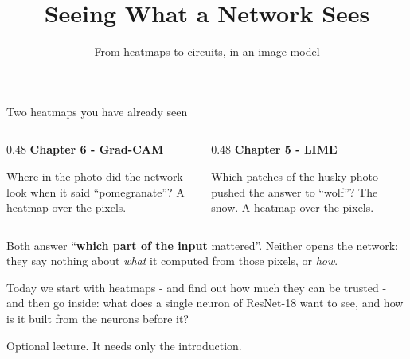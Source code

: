 \documentclass[aspectratio=169]{beamer}
\title{Seeing What a Network Sees}
\subtitle{From heatmaps to circuits, in an image model}
\author{}
\date{}
\newcommand{\keybox}[1]{%
  \begin{tcolorbox}[colback=armblue!8, colframe=armblue, boxrule=0.6pt, arc=2pt]
  #1
  \end{tcolorbox}}
\begin{document}
\begin{frame}[plain]
  \titlepage
\end{frame}

\begin{frame}{Two heatmaps you have already seen}
  \vspace{0.4em}
  \begin{columns}[T]
    \begin{column}{0.48\textwidth}
      \textbf{Chapter 6 - Grad-CAM}

      \vspace{0.3em}
      {\small Where in the photo did the network look when it said ``pomegranate''? A heatmap over
      the pixels.}
    \end{column}
    \begin{column}{0.48\textwidth}
      \textbf{Chapter 5 - LIME}

      \vspace{0.3em}
      {\small Which patches of the husky photo pushed the answer to ``wolf''? The snow. A heatmap
      over the pixels.}
    \end{column}
  \end{columns}

  \vspace{0.9em}
  \keybox{Both answer ``\textbf{which part of the input} mattered''. Neither opens the network: they
  say nothing about \emph{what} it computed from those pixels, or \emph{how}.}

  \vspace{0.6em}
  Today we start with heatmaps - and find out how much they can be trusted - and then go inside:
  what does a single neuron of ResNet-18 want to see, and how is it built from the neurons before
  it?

  \vspace{0.3em}
  {\footnotesize Optional lecture. It needs only the introduction.}
\end{frame}
\end{document}
